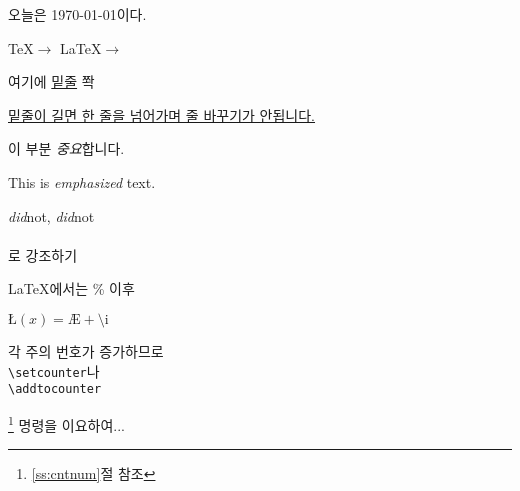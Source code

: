 \documentclass[11pt]{article}
\begin{document}
오늘은 \today 이다.

\TeX $\rightarrow$ \LaTeX $\rightarrow$ \LaTeXe

여기에 \underline{밑줄} 쫙

\underline{밑줄이 길면 한 줄을 넘어가며 줄 바꾸기가 안됩니다.}

이 부분 \emph{중요}합니다.

This is \emph{emphasized} text.

\emph{did}not, \emph{did\/}not \\ \\

로 강조하기

\LaTeX 에서는 \% 이후 %

$\mbox{\L}(x) = \mbox{\AE} + \mbox{\^\i}$

각 주의 번호가 증가하므로 \\
\verb+\setcounter+\footnotemark 나 \\ 
\verb+\addtocounter+\addtocounter{footnote}{-1}\footnote{\ref{ss:cntnum}절 참조} 명령을 이요하여...
\end{document}
